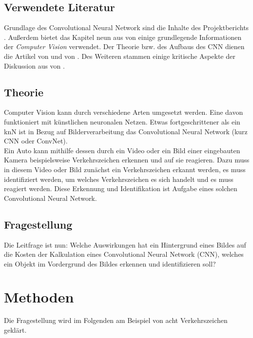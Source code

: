 \documentclass[paper=A4,pagesize=auto,12pt,headinclude=true,footinclude=true,BCOR=0mm,DIV=calc]{scrartcl}
\newcommand{\sectionspace}{
	\vspace{0.5cm}
}
\begin{document}
\subsection{Verwendete Literatur}\label{sec:VerwendeteLiteratur}
Grundlage des Convolutional Neural Network sind die Inhalte des Projektberichts \cite{projektbericht}. Außerdem bietet das Kapitel neun aus  von \citeauthor{script} \cite{script} einige grundlegende Informationen der \textit{Computer Vision} verwendet. Der Theorie bzw. des Aufbaus des CNN dienen die Artikel  von \citeauthor{cnn1} \cite{cnn1} und  von \citeauthor{cnn2} \cite{cnn2}. Des Weiteren stammen einige kritische Aspekte der Diskussion aus  von \citeauthor{discuss1} \cite{discuss1}. 

\subsection{Theorie}\label{sec:Theorie} %
Computer Vision kann durch verschiedene Arten umgesetzt werden. Eine davon funktioniert mit künstlichen neuronalen Netzen. Etwas fortgeschrittener als ein knN ist in Bezug auf Bilderverarbeitung das Convolutional Neural Network (kurz CNN oder ConvNet). \cite{script}\\
Ein Auto kann mithilfe dessen durch ein Video oder ein Bild einer eingebauten Kamera beispielsweise Verkehrszeichen erkennen und auf sie reagieren. Dazu muss in diesem Video oder Bild zunächst ein Verkehrszeichen erkannt werden, es muss identifiziert werden, um welches Verkehrszeichen es sich handelt und es muss reagiert werden. Diese Erkennung und Identifikation ist Aufgabe eines solchen Convolutional Neural Network.

\subsection{Fragestellung}
Die Leitfrage ist nun: Welche Auswirkungen hat ein Hintergrund eines Bildes auf die Kosten der Kalkulation eines Convolutional Neural Network (CNN), welches ein Objekt im Vordergrund des Bildes erkennen und identifizieren soll?

\sectionspace
\section{Methoden}\label{sec:Methoden}
Die Fragestellung wird im Folgenden am Beispiel von acht Verkehrszeichen geklärt.
\end{document}
